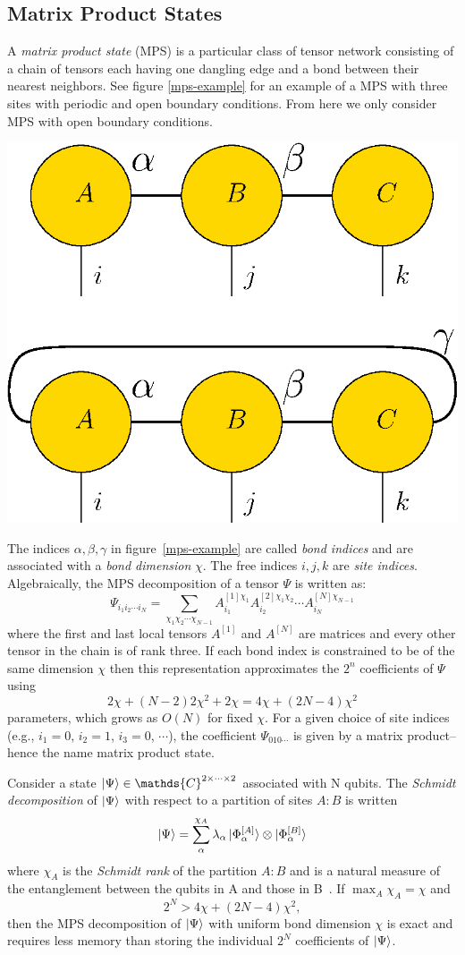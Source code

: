\documentclass[12pt]{article}
\newenvironment{Figure}
  {\par\medskip\noindent\minipage{\linewidth}}
  {\endminipage\par\medskip}
\begin{document}
\begin{multicols}{2}
\section{Matrix Product States}
	A \textit{matrix product state} (MPS) is a particular class
	of
	tensor network consisting of a chain of tensors each having one
	dangling edge and a bond between their nearest neighbors. See figure
	\ref{mps-example} for an example of a MPS with three sites with
	periodic and open boundary conditions. From here we only
	consider MPS with open boundary conditions.
	\begin{Figure}
		\center\includegraphics[width=.55\textwidth]{./Figures/mps-example.eps}
		\label{mps-example}
	\end{Figure}
	The indices $\alpha,\beta,\gamma$ in figure~\ref{mps-example} are called
	\textit{bond indices} and are associated with a
	\textit{bond dimension} $\chi$. The free indices $i,j,k$ are
	\textit{site indices}. Algebraically, the MPS decomposition of a tensor $\Psi$ is written as:
	$$\Psi_{i_1i_2\cdots i_N}=\sum_{\chi_1\chi_2\cdots\chi_{N-1}}A^{[1]\chi_1}_{i_1}A_{i_2}^{[2]\chi_1\chi_2}\cdots A^{[N]\chi_{N-1}}_{i_N}$$
	where the first and last local tensors $A^{[1]}$ and $A^{[N]}$ are
	matrices and every other tensor in the chain is of rank three. If
	each bond index is constrained to be of the same dimension $\chi$ then
	this representation approximates the $2^n$ coefficients of $\Psi$ using
	$$2\chi+(N-2)2\chi^2+2\chi=4\chi+(2N-4)\chi^2$$
	parameters, which grows as $O(N)$ for fixed $\chi$.
	For a given choice of site indices (e.g., $i_1=0$, $i_2=1$, $i_3=0$,
	$\cdots$), the coefficient $\Psi_{010\cdots}$ is given by a matrix
	product-- hence the name matrix product state.

	Consider a state $\ket{\Psi}\in\mathds{C}^{2\times\cdots\times2}$
	associated with N qubits.
	The \textit{Schmidt decomposition} of $\ket{\Psi}$ with respect to a
	partition of sites $A:B$ is written
	$$\ket{\Psi}=\sum_\alpha^{\chi_A}\lambda_\alpha\ket{\Phi_\alpha^{[A]}}\otimes\ket{\Phi_\alpha^{[B]}}$$
	where $\chi_A$ is the \textit{Schmidt rank} of the partition $A:B$
	and is a natural measure of the entanglement between the qubits in A
	and those in B~\cite{Vidal}. If $\max_A\chi_A=\chi$ and
	$$2^N>4\chi+(2N-4)\chi^2,$$
	then the MPS decomposition of $\ket{\Psi}$ with uniform bond
	dimension $\chi$ is exact and requires less memory than storing the
	individual $2^N$ coefficients of $\ket{\Psi}$.


\end{multicols}
\end{document}
